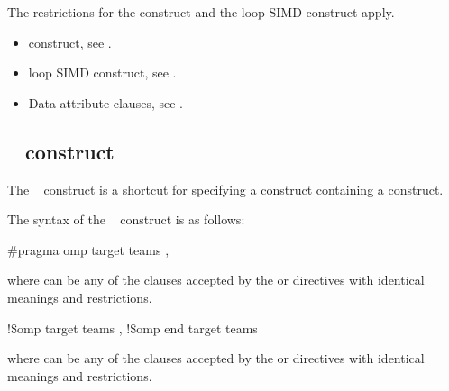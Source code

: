\restrictions
The restrictions for the  construct and the loop SIMD construct apply.

\crossreferences
\begin{itemize}
\item {} construct, see 
.

\item loop SIMD construct, see 
.

\item Data attribute clauses, see 
. 
\end{itemize}










\subsection{~ construct}
\label{subsec:target teams construct}
\summary
The ~ construct is a shortcut for specifying a  construct 
containing a  construct.

\syntax
The syntax of the ~ construct is as follows:

\ccppspecificstart
\begin{boxedcode}
\#pragma omp target teams \plc{[clause[ [},\plc{] clause] ... ]}
\end{boxedcode}

where  can be any of the clauses accepted by the  or  directives 
with identical meanings and restrictions.
\ccppspecificend

\fortranspecificstart
\begin{boxedcode}
!\$omp target teams \plc{[clause[ [},\plc{] clause] ... ]}
!\$omp end target teams
\end{boxedcode}

where  can be any of the clauses accepted by the  or  directives 
with identical meanings and restrictions.
\fortranspecificend

